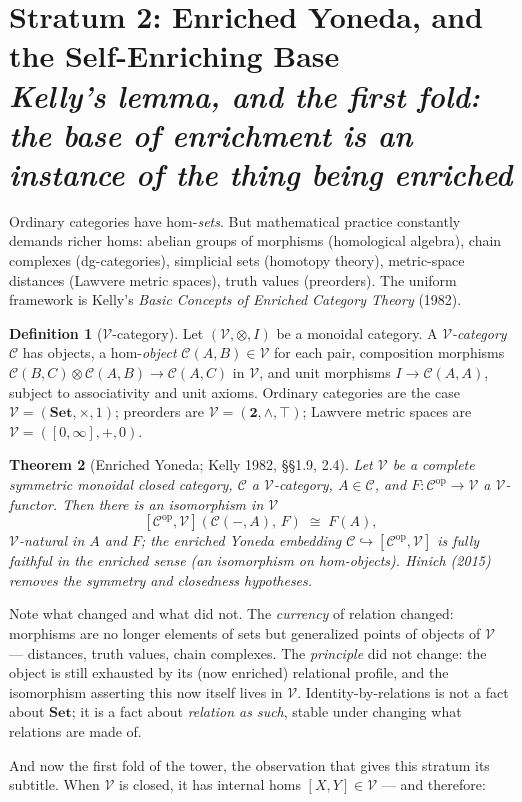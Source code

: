 \documentclass[11pt]{article}
\theoremstyle{plain}
\newtheorem{theorem}{Theorem}[section]
\theoremstyle{definition}
\newtheorem{definition}[theorem]{Definition}
\theoremstyle{remark}
\newcommand{\C}{\mathcal{C}}
\newcommand{\V}{\mathcal{V}}
\newcommand{\Set}{\mathbf{Set}}
\newcommand{\op}{\mathrm{op}}
\newcommand{\stratum}[2]{\section{#1 \\ {\normalsize\normalfont\itshape #2}}}
\begin{document}
\stratum{Stratum 2: Enriched Yoneda, and the Self-Enriching Base}{Kelly's lemma, and the first fold: the base of enrichment is an instance of the thing being enriched}

Ordinary categories have hom-\emph{sets}. But mathematical practice constantly demands richer homs: abelian groups of morphisms (homological algebra), chain complexes (dg-categories), simplicial sets (homotopy theory), metric-space distances (Lawvere metric spaces), truth values (preorders). The uniform framework is Kelly's \emph{Basic Concepts of Enriched Category Theory} (1982).

\begin{definition}[$\V$-category]
Let $(\V, \otimes, I)$ be a monoidal category. A \emph{$\V$-category} $\C$ has objects, a hom-\emph{object} $\C(A,B) \in \V$ for each pair, composition morphisms $\C(B,C) \otimes \C(A,B) \to \C(A,C)$ in $\V$, and unit morphisms $I \to \C(A,A)$, subject to associativity and unit axioms. Ordinary categories are the case $\V = (\Set, \times, 1)$; preorders are $\V = (\mathbf{2}, \wedge, \top)$; Lawvere metric spaces are $\V = ([0,\infty], +, 0)$.
\end{definition}

\begin{theorem}[Enriched Yoneda; Kelly 1982, \S\S 1.9, 2.4]\label{thm:enriched-yoneda}
Let $\V$ be a complete symmetric monoidal closed category, $\C$ a $\V$-category, $A \in \C$, and $F\colon \C^{\op} \to \V$ a $\V$-functor. Then there is an isomorphism \emph{in $\V$}
\[
[\C^{\op}, \V](\C(-,A),\, F) \;\cong\; F(A),
\]
$\V$-natural in $A$ and $F$; the enriched Yoneda embedding $\C \hookrightarrow [\C^{\op}, \V]$ is fully faithful in the enriched sense (an isomorphism on hom-objects). Hinich (2015) removes the symmetry and closedness hypotheses.
\end{theorem}

Note what changed and what did not. The \emph{currency} of relation changed: morphisms are no longer elements of sets but generalized points of objects of $\V$ --- distances, truth values, chain complexes. The \emph{principle} did not change: the object is still exhausted by its (now enriched) relational profile, and the isomorphism asserting this now itself lives in $\V$. Identity-by-relations is not a fact about $\Set$; it is a fact about \emph{relation as such}, stable under changing what relations are made of.

And now the first fold of the tower, the observation that gives this stratum its subtitle. When $\V$ is closed, it has internal homs $[X,Y] \in \V$ --- and therefore:
\end{document}
